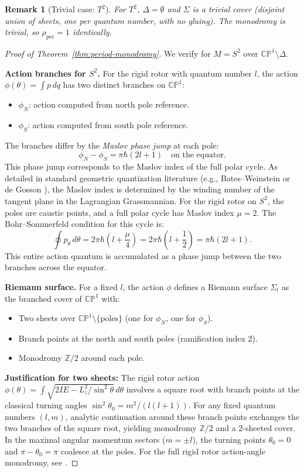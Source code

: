 \documentclass[11pt]{article}
\newtheorem{remark}[theorem]{Remark}
\begin{document}
\begin{remark}[Trivial case: $T^2$]
For $T^2$, $\Delta = \emptyset$ and $\Sigma$ is a trivial cover
(disjoint union of sheets, one per quantum number, with no gluing).
The monodromy is trivial, so $\rho_{\mathrm{per}} = 1$ identically.
\end{remark}

\begin{proof}[Proof of Theorem~\ref{thm:period-monodromy}]
We verify for $M = S^2$ over $\mathbb{CP}^1 \setminus \Delta$.

\textbf{Action branches for $S^2$.} For the rigid rotor with quantum number $l$,
the action $\phi(\theta) = \int p\,dq$ has two distinct branches on $\mathbb{CP}^1$:
\begin{itemize}
  \item $\phi_N$: action computed from north pole reference.
  \item $\phi_S$: action computed from south pole reference.
\end{itemize}
The branches differ by the \emph{Maslov phase jump} at each pole:
\[
  \phi_N - \phi_S = \pi\hbar(2l+1)
  \quad\text{on the equator.}
\]
This phase jump corresponds to the Maslov index of the full polar cycle. As detailed in standard geometric quantization literature (e.g., Bates--Weinstein \cite[\S 7.4]{BW97} or de Gosson \cite[Ch.~8]{Gos11}), the Maslov index is determined by the winding number of the tangent plane in the Lagrangian Grassmannian. For the rigid rotor on $S^2$, the poles are caustic points, and a full polar cycle has Maslov index $\mu = 2$. The Bohr--Sommerfeld condition for this cycle is:
\[
  \oint p_\theta\, d\theta = 2\pi\hbar\left(l + \frac{\mu}{4}\right) = 2\pi\hbar\left(l + \frac{1}{2}\right) = \pi\hbar(2l+1).
\]
This entire action quantum is accumulated as a phase jump between the two branches across the equator.

\textbf{Riemann surface.} For a fixed $l$, the action $\phi$ defines a
Riemann surface $\Sigma_l$ as the branched cover of $\mathbb{CP}^1$ with:
\begin{itemize}
  \item Two sheets over $\mathbb{CP}^1 \setminus \{\mathrm{poles}\}$ (one for $\phi_N$, one for $\phi_S$).
  \item Branch points at the north and south poles (ramification index 2).
  \item Monodromy $\mathbb{Z}/2$ around each pole.
\end{itemize}

\textbf{Justification for two sheets:} The rigid rotor action
$\phi(\theta) = \int \sqrt{2IE - L_z^2/\sin^2\theta}\, d\theta$ involves
a square root with branch points at the classical turning angles
$\sin^2\theta_0 = m^2/(l(l+1))$. For any fixed quantum numbers $(l, m)$,
analytic continuation around these branch points exchanges the two
branches of the square root, yielding monodromy $\mathbb{Z}/2$ and a
2-sheeted cover. In the maximal angular momentum sectors ($m = \pm l$),
the turning points $\theta_0 = 0$ and $\pi - \theta_0 = \pi$ coalesce at
the poles. For the full rigid rotor action-angle monodromy, see
\cite{BW97, LS26}.


\end{proof}
\end{document}
